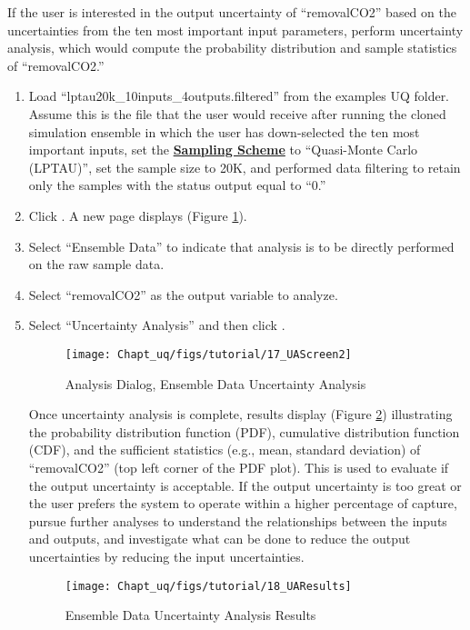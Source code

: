 If the user is interested in the output uncertainty of “removalCO2” based on the uncertainties from the ten most important input parameters, perform uncertainty analysis, which would compute the probability distribution and sample statistics of ``removalCO2.''
\begin{enumerate}
\item{Load ``lptau20k\_10inputs\_4outputs.filtered'' from the examples\bs
  UQ folder. Assume this is the file that the user would receive after
  running the cloned simulation ensemble in which the user has
  down-selected the ten most important inputs, set the
  \textbf{\underline{Sampling Scheme}} to ``Quasi-Monte Carlo (LPTAU)'',
  set the sample size to 20K, and performed data filtering to retain only the samples with the status output equal to ``0.''}
\item{Click .  A new page displays (Figure \ref{fig:uqt_analysis_ua}).}
\item{Select ``Ensemble Data'' to indicate that analysis is to be directly performed on the raw
sample data.}
\item{Select ``removalCO2'' as the output variable to analyze.}
\item{Select ``Uncertainty Analysis'' and then click .}

\begin{figure}[H]
\centering \texttt{[image: Chapt\_uq/figs/tutorial/17\_UAScreen2]}
\caption{Analysis Dialog, Ensemble Data Uncertainty Analysis}
\label{fig:uqt_analysis_ua}
\end{figure}

Once uncertainty analysis is complete, results display (Figure \ref{fig:uqt_ua_results}) illustrating the probability distribution function (PDF), cumulative distribution function (CDF), and the sufficient statistics (e.g., mean, standard deviation) of ``removalCO2'' (top left corner of the PDF plot). This is used to evaluate if the output uncertainty is acceptable. If the output uncertainty is too great or the user prefers the system to operate within a higher percentage of capture, pursue further analyses to understand the relationships between the inputs and outputs, and investigate what can be done to reduce the output uncertainties by reducing the input uncertainties.

\begin{figure}[H]
	\centering \texttt{[image: Chapt\_uq/figs/tutorial/18\_UAResults]}
	\caption{Ensemble Data Uncertainty Analysis Results}
	\label{fig:uqt_ua_results}
\end{figure}


\end{enumerate}
